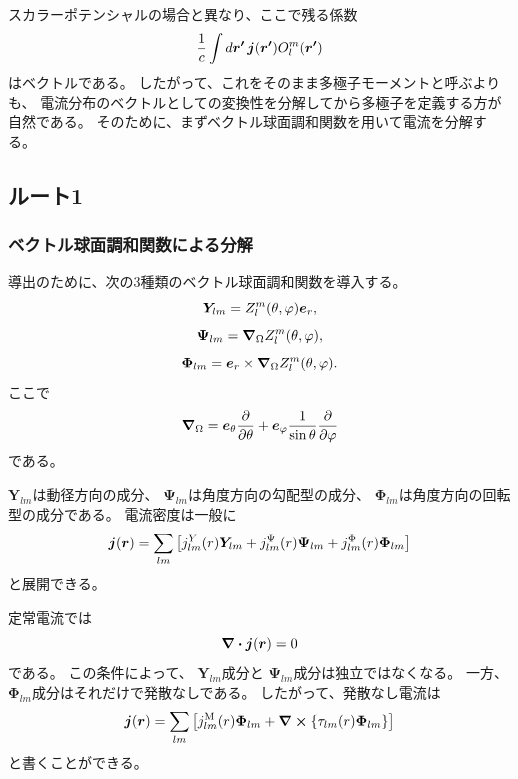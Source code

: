 \documentclass[../master.tex]{subfiles}
\begin{document}
スカラーポテンシャルの場合と異なり、ここで残る係数
\begin{equation}
    \frac{1}{c}\int d\vb*{r'}\,
    \vb*{j}(\vb*{r'})O_l^m(\vb*{r'})
\end{equation}
はベクトルである。
したがって、これをそのまま多極子モーメントと呼ぶよりも、
電流分布のベクトルとしての変換性を分解してから多極子を定義する方が自然である。
そのために、まずベクトル球面調和関数を用いて電流を分解する。

\subsection{ルート1}
\subsubsection*{ベクトル球面調和関数による分解}

導出のために、次の3種類のベクトル球面調和関数を導入する。
\begin{equation}
    \boldsymbol{Y}_{lm}
    =
    Z_l^m(\theta,\varphi)\vb*{e}_r ,
\end{equation}
\begin{equation}
    \boldsymbol{\Psi}_{lm}
    =
    \grad_\Omega Z_l^m(\theta,\varphi),
\end{equation}
\begin{equation}
    \boldsymbol{\Phi}_{lm}
    =
    \vb*{e}_r\times\grad_\Omega Z_l^m(\theta,\varphi).
\end{equation}
ここで
\begin{equation}
    \grad_\Omega
    =
    \vb*{e}_\theta\pdv{\theta}
    +
    \vb*{e}_\varphi
    \frac{1}{\sin\theta}\pdv{\varphi}
\end{equation}
である。

\(\boldsymbol{Y}_{lm}\)は動径方向の成分、
\(\boldsymbol{\Psi}_{lm}\)は角度方向の勾配型の成分、
\(\boldsymbol{\Phi}_{lm}\)は角度方向の回転型の成分である。
電流密度は一般に
\begin{equation}
    \vb*{j}(\vb*{r})
    =
    \sum_{lm}
    \qty[
    j_{lm}^{Y}(r)\boldsymbol{Y}_{lm}
    +
    j_{lm}^{\Psi}(r)\boldsymbol{\Psi}_{lm}
    +
    j_{lm}^{\Phi}(r)\boldsymbol{\Phi}_{lm}
    ]
\end{equation}
と展開できる。

定常電流では
\begin{equation}
    \div\vb*{j}(\vb*{r})=0
\end{equation}
である。
この条件によって、
\(\boldsymbol{Y}_{lm}\)成分と
\(\boldsymbol{\Psi}_{lm}\)成分は独立ではなくなる。
一方、
\(\boldsymbol{\Phi}_{lm}\)成分はそれだけで発散なしである。
したがって、発散なし電流は
\begin{equation}
    {
    \vb*{j}(\vb*{r})
    =
    \sum_{lm}
    \qty[
    j_{lm}^{\mathrm{M}}(r)
    \boldsymbol{\Phi}_{lm}
    +
    \curl\qty{
    \tau_{lm}(r)\boldsymbol{\Phi}_{lm}
    }
    ]
    }
\end{equation}
と書くことができる。
\end{document}
